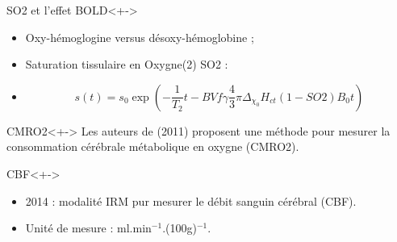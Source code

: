 \begin{frame}
\begin{block}{SO2 et l'effet BOLD}<+->
\begin{itemize}
\item<+-> Oxy-h\'emoglogine versus d\'esoxy-h\'emoglobine ;
\item<+-> Saturation tissulaire en Oxygne(2) SO2 :
\item<+-> \[s(t)=s_0\exp\left(-\frac{1}{T_2}t-BVf\gamma\frac{4}{3}\pi\Delta_{\chi_0}H_{ct}(1-SO2)B_0t\right)\]
\end{itemize}
\end{block}

\begin{block}{CMRO2}<+->
Les auteurs de \cite{quixotic} (2011) proposent une m\'ethode pour mesurer la consommation c\'er\'ebrale m\'etabolique en oxygne (CMRO2).
\end{block}

\end{frame}


\begin{block}{CBF}<+->
\begin{itemize}
\item<+-> 2014 : modalit\'e IRM pur mesurer le d\'ebit sanguin c\'er\'ebral (CBF).
\item<+-> Unit\'e de mesure : ml.min${}^{-1}$.(100g)${}^{-1}$.
\end{itemize}
\end{block}
